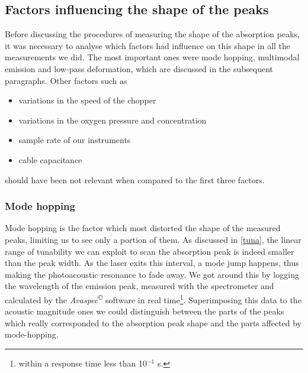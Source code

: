 \subsection{Factors influencing the shape of the peaks}\label{factorshape}
Before discussing the procedures of measuring the shape of the absorption peaks, it was necessary to analyse which factors had influence on this shape in all the measurements we did. The most important ones were mode hopping, multimodal emission and low-pass deformation, which are discussed in the subsequent paragraphs. Other factors such as
\begin{itemize}
\item variations in the speed of the chopper
\item variations in the oxygen pressure and concentration
\item sample rate of our instruments
\item cable capacitance 
\end{itemize}
should have been not relevant when compared to the first three factors.

\subsubsection{Mode hopping} 
Mode hopping is the factor which most distorted the shape of the measured peaks, limiting us to see only a portion of them. As discussed in \cref{tuna}, the linear range of tunability we can exploit to scan the absorption peak is indeed smaller than the peak width. As the laser exits this interval, a mode jump happens, thus making the photoacoustic resonance to fade away. We got around this by logging the wavelength of the emission peak, measured with the spectrometer and calculated by the \textit{Avaspec}\textsuperscript{\copyright} software in real time\footnote{within a response time less than 10$^{-1}$ s.}. Superimposing this data to the acoustic magnitude ones we could distinguish between the parts of the peaks which really corresponded to the absorption peak shape and the parts affected by mode-hopping.

